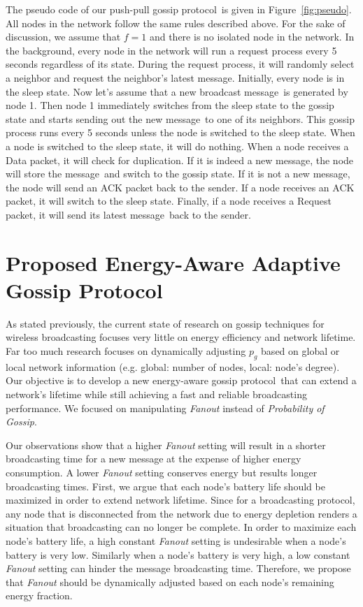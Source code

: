 \documentclass[onehalf,11pt]{beavtex}
\newcommand{\gp}{gossip protocol}
\newcommand{\pog}{Probability of Gossip}
\newcommand{\msg}{message}
\begin{document}
The pseudo code of our push-pull \gp ~is given in Figure~\ref{fig:pseudo}. All nodes in the network follow the same rules described above. For the sake of discussion, we assume that $f=1$ and there is no isolated node in the network. In the background, every node in the network will run a request process every 5 seconds regardless of its state. During the request process, it will randomly select a neighbor and request the neighbor's latest \msg. Initially, every node is in the sleep state. Now let's assume that a new broadcast \msg ~is generated by node 1. Then node 1 immediately switches from the sleep state to the gossip state and starts sending out the new \msg ~to one of its neighbors. This gossip process runs every 5 seconds unless the node is switched to the sleep state. When a node is switched to the sleep state, it will do nothing. When a node receives a Data packet, it will check for duplication. If it is indeed a new \msg, the node will store the \msg ~and switch to the gossip state. If it is not a new \msg, the node will send an ACK packet back to the sender. If a node receives an ACK packet, it will switch to the sleep state. Finally, if a node receives a Request packet, it will send its latest \msg ~back to the sender. 

\section{Proposed Energy-Aware Adaptive Gossip Protocol}
As stated previously, the current state of research on gossip techniques for wireless broadcasting focuses very little on energy efficiency and network lifetime. Far too much research focuses on dynamically adjusting $p_g$ based on global or local network information (e.g. global: number of nodes, local: node's degree). Our objective is to develop a new energy-aware \gp ~that can extend a network's lifetime while still achieving a fast and reliable broadcasting performance. We focused on manipulating \emph{Fanout} instead of \emph{\pog}.

Our observations show that a higher \emph{Fanout} setting will result in a shorter broadcasting time for a new message at the expense of higher energy consumption. A lower \emph{Fanout} setting conserves energy but results longer broadcasting times. First, we argue that each node's battery life should be maximized in order to extend network lifetime. Since for a broadcasting protocol, any node that is disconnected from the network due to energy depletion renders a situation that broadcasting can no longer be complete. In order to maximize each node's battery life, a high constant \emph{Fanout} setting is undesirable when a node's battery is very low. Similarly when a node's battery is very high, a low constant \emph{Fanout} setting can hinder the message broadcasting time. Therefore, we propose that \emph{Fanout} should be dynamically adjusted based on each node's remaining energy fraction. 
\end{document}
